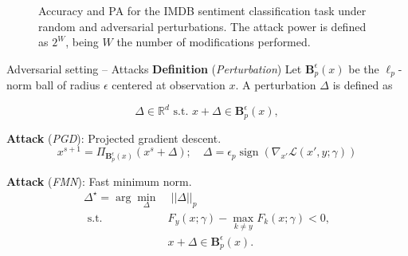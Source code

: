 \begin{frame}
\begin{figure}[H]
\begin{subfigure}[b]{0.3\textwidth}
		\end{subfigure}
		\caption{
			Accuracy and PA for the IMDB sentiment classification task under random 
			and adversarial perturbations. The attack power is defined as $2^W$, being $W$ the
			number of modifications performed.
		}
	\end{figure}
\end{frame}

\begin{frame}
    \centering
    \Huge{\insertsection}  %
\end{frame}


\begin{frame}{Adversarial setting -- Attacks}
	\textbf{Definition} (\textit{Perturbation}) Let $\mathbf{B}_p^\epsilon(x)$ be the $\ell_p$-norm ball of radius 
		$\epsilon$ centered at observation $x$. A perturbation $\Delta$ is defined as
	
		$$
			\Delta \in \mathbb{R}^d \text{ s.t. } x + \Delta \in \mathbf{B}_p^\epsilon(x),
		$$

	\textbf{Attack} (\textit{PGD}): Projected gradient descent.
	$$
        x^{s+1} = \Pi_{\mathbf{B}_p^\epsilon(x)} \left ( x^s + \Delta \right ); \quad \Delta = \epsilon_p \operatorname{sign}(\nabla_{x'} \mathcal{L}(x', y; \gamma))
    $$

	\textbf{Attack} (\textit{FMN}): Fast minimum norm.
	$$
        \begin{aligned}
            \Delta^\star = \arg \min_\Delta & \; ||\Delta||_p \\
            \text { s.t. } & F_y(x; \gamma)- \max_{k \neq y} F_k(x; \gamma) < 0, \\
            & x + \Delta \in \mathbf{B}_p^\epsilon(x).
        \end{aligned}
    $$
\end{frame}

